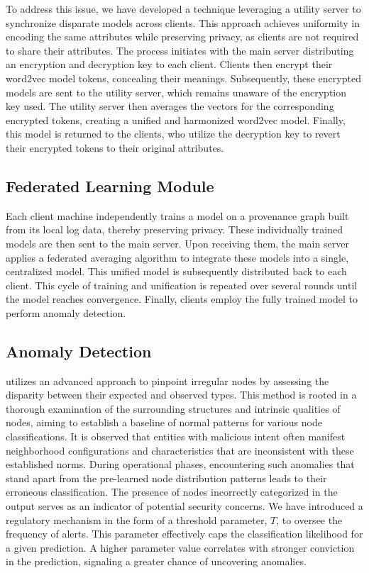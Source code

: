 To address this issue, we have developed a technique leveraging a utility server to synchronize disparate models across clients. This approach achieves uniformity in encoding the same attributes while preserving privacy, as clients are not required to share their attributes. The process initiates with the main server distributing an encryption and decryption key to each client. Clients then encrypt their word2vec model tokens, concealing their meanings. Subsequently, these encrypted models are sent to the utility server, which remains unaware of the encryption key used. The utility server then averages the vectors for the corresponding encrypted tokens, creating a unified and harmonized word2vec model. Finally, this model is returned to the clients, who utilize the decryption key to revert their encrypted tokens to their original attributes.

\subsection{Federated Learning Module}
Each client machine independently trains a \gnn model on a provenance graph built from its local log data, thereby preserving privacy. These individually trained models are then sent to the main server. Upon receiving them, the main server applies a federated averaging algorithm to integrate these models into a single, centralized model. This unified model is subsequently distributed back to each client. This cycle of training and unification is repeated over several rounds until the model reaches convergence. Finally, clients employ the fully trained model to perform anomaly detection.

\subsection{Anomaly Detection}
\Sys utilizes an advanced approach to pinpoint irregular nodes by assessing the disparity between their expected and observed types. This method is rooted in a thorough examination of the surrounding structures and intrinsic qualities of nodes, aiming to establish a baseline of normal patterns for various node classifications. It is observed that entities with malicious intent often manifest neighborhood configurations and characteristics that are inconsistent with these established norms. During operational phases, encountering such anomalies that stand apart from the pre-learned node distribution patterns leads to their erroneous classification. The presence of nodes incorrectly categorized in the output serves as an indicator of potential security concerns. We have introduced a regulatory mechanism in the form of a threshold parameter, $T$, to oversee the frequency of alerts. This parameter effectively caps the classification likelihood for a given prediction. A higher parameter value correlates with stronger conviction in the prediction, signaling a greater chance of uncovering anomalies.


